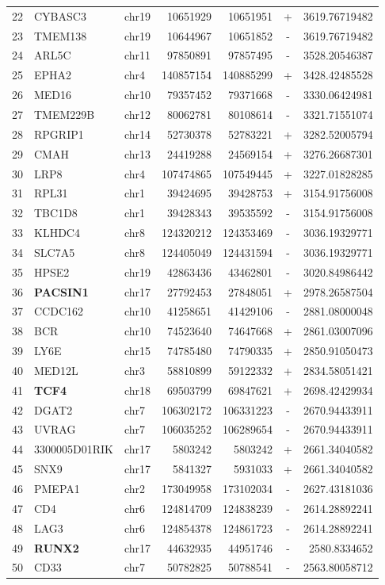 \begin{table}
\begin{tabular}{rllrrcr}
22 & CYBASC3 & chr19 & 10651929 & 10651951 & + & 3619.76719482 \\
23 & TMEM138 & chr19 & 10644967 & 10651852 & - & 3619.76719482 \\
24 & ARL5C & chr11 & 97850891 & 97857495 & - & 3528.20546387 \\
25 & EPHA2 & chr4 & 140857154 & 140885299 & + & 3428.42485528 \\
26 & MED16 & chr10 & 79357452 & 79371668 & - & 3330.06424981 \\
27 & TMEM229B & chr12 & 80062781 & 80108614 & - & 3321.71551074 \\
28 & RPGRIP1 & chr14 & 52730378 & 52783221 & + & 3282.52005794 \\
29 & CMAH & chr13 & 24419288 & 24569154 & + & 3276.26687301 \\
30 & LRP8 & chr4 & 107474865 & 107549445 & + & 3227.01828285 \\
31 & RPL31 & chr1 & 39424695 & 39428753 & + & 3154.91756008 \\
32 & TBC1D8 & chr1 & 39428343 & 39535592 & - & 3154.91756008 \\
33 & KLHDC4 & chr8 & 124320212 & 124353469 & - & 3036.19329771 \\
34 & SLC7A5 & chr8 & 124405049 & 124431594 & - & 3036.19329771 \\
35 & HPSE2 & chr19 & 42863436 & 43462801 & - & 3020.84986442 \\
36 & \textbf{PACSIN1} & chr17 & 27792453 & 27848051 & + & 2978.26587504 \\
37 & CCDC162 & chr10 & 41258651 & 41429106 & - & 2881.08000048 \\
38 & BCR & chr10 & 74523640 & 74647668 & + & 2861.03007096 \\
39 & LY6E & chr15 & 74785480 & 74790335 & + & 2850.91050473 \\
40 & MED12L & chr3 & 58810899 & 59122332 & + & 2834.58051421 \\
41 & \textbf{TCF4} & chr18 & 69503799 & 69847621 & + & 2698.42429934 \\
42 & DGAT2 & chr7 & 106302172 & 106331223 & - & 2670.94433911 \\
43 & UVRAG & chr7 & 106035252 & 106289654 & - & 2670.94433911 \\
44 & 3300005D01RIK & chr17 & 5803242 & 5803242 & + & 2661.34040582 \\
45 & SNX9 & chr17 & 5841327 & 5931033 & + & 2661.34040582 \\
46 & PMEPA1 & chr2 & 173049958 & 173102034 & - & 2627.43181036 \\
47 & CD4 & chr6 & 124814709 & 124838239 & - & 2614.28892241 \\
48 & LAG3 & chr6 & 124854378 & 124861723 & - & 2614.28892241 \\
49 & \textbf{RUNX2} & chr17 & 44632935 & 44951746 & - & 2580.8334652 \\
50 & CD33 & chr7 & 50782825 & 50788541 & - & 2563.80058712 \\


\end{tabular}
\end{table}
